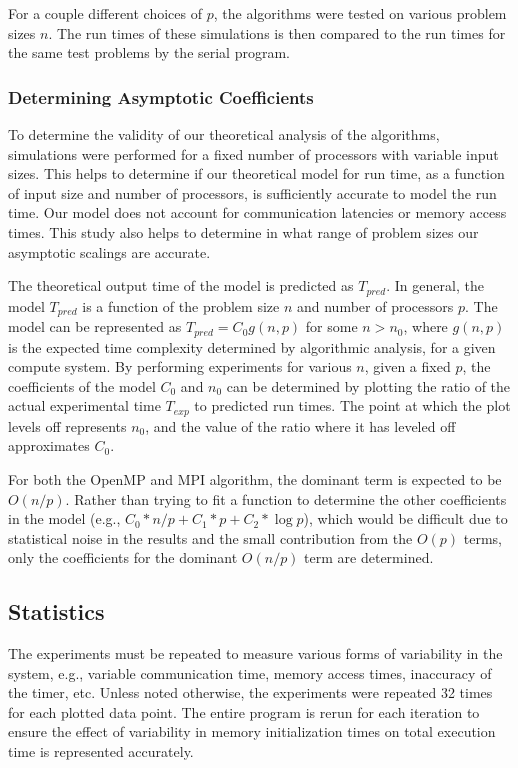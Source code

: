 \documentclass[12pt]{article}
\begin{document}
\begin{algorithm}
{{{For a couple different choices of $p$, the algorithms were tested on various problem
sizes $n$. The run times of these simulations is then compared to the run times for
the same test problems by the serial program.  

\subsubsection{Determining Asymptotic Coefficients}

To determine the validity of our theoretical analysis of the algorithms, simulations
were performed for a fixed number of processors with variable input sizes.  This
helps to determine if our theoretical model for run time, as a function of input
size and number of processors, is sufficiently accurate to model the run time.  Our model does not account for
communication latencies or memory access times.  This study also helps to determine in what
range of problem sizes our asymptotic scalings are accurate.  

The theoretical output time of the model is predicted as $T_{pred}$. In general,
the model $T_{pred}$ is a function of the problem size $n$ and number of processors $p$.
The model can be represented as $T_{pred} = C_0 g(n,p)$ for some $n>n_0$, where
$g(n,p)$ is the expected time complexity determined by algorithmic analysis, for a given
compute system.  By performing experiments for various $n$, given a fixed $p$, the
coefficients of the model $C_0$ and $n_0$ can be determined by plotting the ratio of
the actual experimental time $T_{exp}$ to predicted run times.  The point at which
the plot levels off represents $n_0$, and the value of the ratio where it has leveled
off approximates $C_0$.

For both the OpenMP and MPI algorithm, the dominant term is expected to be $O(n/p)$.
Rather than trying to fit a function to determine the other coefficients in the
model (e.g., $C_0*n/p+C_1*p + C_2*\log p$), which would be difficult due to statistical noise in the results and the small
contribution from the $O(p)$ terms, only the coefficients for the dominant $O(n/p)$
term are determined.  


\subsection{Statistics}

The experiments must be repeated to measure various forms of variability in the
system, e.g., variable communication time, memory access times, inaccuracy of the
timer, etc.  Unless noted otherwise, the experiments were repeated 32 times for each
plotted data point.  The entire program is rerun for each iteration to ensure the
effect of variability in memory initialization times on total execution time is represented
accurately.  

}}}
\end{algorithm}
\end{document}

